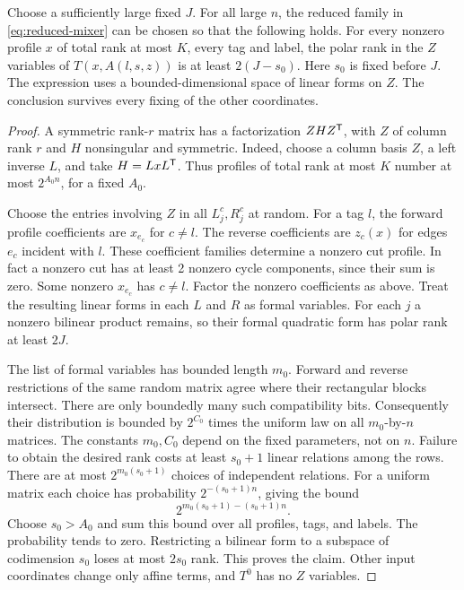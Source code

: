 \begin{lemma}\label{lem:generic-mixers}
Choose a sufficiently large fixed \(J\). For all large \(n\), the reduced
family in \eqref{eq:reduced-mixer} can be chosen so that the following holds.
For every nonzero profile \(x\) of total rank at most \(K\), every tag and
label, the polar rank in the \(Z\) variables of \(T(x,A(l,s,z))\)
is at least \(2(J-s_0)\). Here \(s_0\) is fixed before \(J\).
The expression uses a bounded-dimensional space of linear forms on \(Z\).
The conclusion survives every fixing of the other coordinates.
\end{lemma}
\begin{proof}
A symmetric rank-\(r\) matrix has a factorization \(ZHZ^{\mathsf T}\), with
\(Z\) of column rank \(r\) and \(H\) nonsingular and symmetric.
Indeed, choose a column basis \(Z\), a left inverse \(L\), and take
\(H=LxL^{\mathsf T}\). Thus profiles of total rank at most \(K\) number
at most \(2^{A_0n}\), for a fixed \(A_0\).

Choose the entries involving \(Z\) in all \(L_j^c,R_j^c\) at random.
For a tag \(l\), the forward profile coefficients are \(x_{e_c}\) for
\(c\ne l\). The reverse coefficients are \(z_c(x)\) for edges
\(e_c\) incident with \(l\). These coefficient families determine a
nonzero cut profile. In fact a nonzero cut has at least 2 nonzero cycle
components, since their sum is zero. Some nonzero \(x_{e_c}\) has \(c\ne l\).
Factor the nonzero coefficients as above. Treat the resulting linear
forms in each \(L\) and \(R\) as formal variables. For each \(j\) a
nonzero bilinear product remains, so their formal quadratic form has polar
rank at least \(2J\).

The list of formal variables has bounded length \(m_0\). Forward and
reverse restrictions of the same random matrix agree where their
rectangular blocks intersect. There are only boundedly many such
compatibility bits. Consequently their distribution is bounded by
\(2^{C_0}\) times the uniform law on all \(m_0\)-by-\(n\) matrices.
The constants \(m_0,C_0\) depend on the fixed parameters, not on \(n\).
Failure to obtain the desired rank costs at least \(s_0+1\) linear
relations among the rows. There are at most \(2^{m_0(s_0+1)}\) choices
of independent relations. For a uniform matrix each choice has
probability \(2^{-(s_0+1)n}\), giving the bound
\[
 2^{m_0(s_0+1)-(s_0+1)n}.
\]
Choose \(s_0>A_0\) and sum this bound over all profiles, tags, and labels.
The probability tends to zero. Restricting a bilinear form to a subspace
of codimension \(s_0\) loses at most \(2s_0\) rank. This proves the
claim. Other input coordinates change only affine terms, and \(T^0\)
has no \(Z\) variables.
\end{proof}

